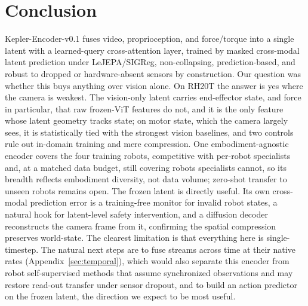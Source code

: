 \documentclass{article}
\begin{document}
\section{Conclusion}
\label{sec:conclusion}
Kepler-Encoder-v0.1 fuses video, proprioception, and force/torque into a single latent with a learned-query cross-attention layer, trained by masked cross-modal latent prediction under LeJEPA/SIGReg, non-collapsing, prediction-based, and robust to dropped or hardware-absent sensors by construction. Our question was whether this buys anything over vision alone. On RH20T the answer is yes where the camera is weakest. The vision-only latent carries end-effector state, and force in particular, that raw frozen-ViT features do not, and it is the only feature whose latent geometry tracks state; on motor state, which the camera largely sees, it is statistically tied with the strongest vision baselines, and two controls rule out in-domain training and mere compression. One embodiment-agnostic encoder covers the four training robots, competitive with per-robot specialists and, at a matched data budget, still covering robots specialists cannot, so its breadth reflects embodiment diversity, not data volume; zero-shot transfer to unseen robots remains open. The frozen latent is directly useful. Its own cross-modal prediction error is a training-free monitor for invalid robot states, a natural hook for latent-level safety intervention, and a diffusion decoder reconstructs the camera frame from it, confirming the spatial compression preserves world-state. The clearest limitation is that everything here is single-timestep. The natural next steps are to fuse streams across time at their native rates (Appendix~\ref{sec:temporal}), which would also separate this encoder from robot self-supervised methods that assume synchronized observations and may restore read-out transfer under sensor dropout, and to build an action predictor on the frozen latent, the direction we expect to be most useful.


\clearpage




\appendix
\clearpage
\end{document}
